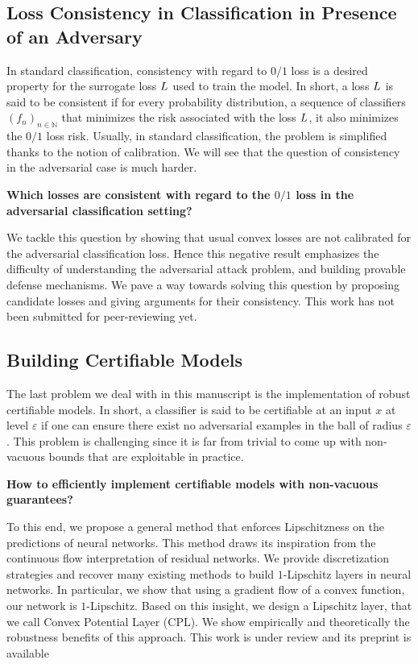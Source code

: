 \subsection{Loss Consistency in Classification in Presence of an Adversary}
In standard classification, consistency with regard to $0/1$ loss is a desired property for the surrogate loss $L$ used to train the model. In short, a loss $L$ is said to be consistent if for every probability distribution, a sequence of classifiers $(f_n)_{n\in\mathbb{N}}$ that minimizes the risk associated with the loss $L$, it also minimizes the $0/1$ loss risk. Usually, in standard classification, the problem is simplified thanks to the notion of calibration. We will see that the question of consistency in the adversarial case is much harder. 
\medskip
\begin{tcolorbox}[colback=grund,colframe=rahmen,title=Question 2]
\textbf{Which losses are consistent with regard to the $0/1$ loss in the adversarial classification setting?}
\end{tcolorbox}
\medskip
We tackle this question by showing that usual convex losses are not calibrated for the adversarial classification loss. Hence this negative result emphasizes the difficulty of understanding the adversarial attack problem, and building provable defense mechanisms. We pave a way towards solving this question by proposing candidate losses and giving arguments for their consistency. This work has not been submitted for peer-reviewing yet. 
\subsection{Building Certifiable Models}

The last problem we deal with in this manuscript is the implementation of robust certifiable models. In short, a classifier is said to be certifiable at an input $x$ at level $\varepsilon$ if one can ensure there exist no adversarial examples in the ball of radius $\varepsilon$. This problem is challenging since it is far from trivial to come up with non-vacuous bounds that are exploitable in practice.
\medskip
\begin{tcolorbox}[colback=grund,colframe=rahmen,title=Question 3]
\textbf{How to efficiently implement certifiable models with non-vacuous guarantees?}
\end{tcolorbox}
\medskip
To this end, we propose  a general method that enforces Lipschitzness on the predictions of neural networks. This method draws its inspiration from the continuous flow interpretation of residual networks. We provide discretization strategies and recover many existing methods to build $1$-Lipschitz layers in neural networks. In particular, we show that using a gradient flow of a convex function, our network is $1$-Lipschitz. Based on this insight, we design a Lipschitz layer, that we call Convex Potential Layer (CPL). We show empirically and theoretically the robustness benefits of this approach. This work is under review and its preprint is available~\citep{meunier2021scalable}

